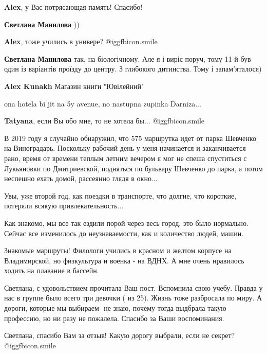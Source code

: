\begin{itemize}
\begin{itemize} %
\textbf{Alex}, у Вас потрясающая память! Спасибо!

\textbf{Светлана Манилова} ))

\textbf{Alex}, тоже учились в универе? @igg{fbicon.smile} 

\textbf{Светлана Манилова} так, на біологічному.
Але я і виріс поруч, тому 11-й був один із варіантів проїзду до центру. З глибокого дитинства. Тому і запам'яталося)

\textbf{Alex Kunakh} Магазин книги "Ювілейний"

ona hotela bi jit na 5y avenue, no nastupna zupinka Darniza...

\textbf{Tatyana}, если Вы обо мне, то не хотела бы... @igg{fbicon.smile} 
\end{itemize} %


В 2019 году я случайно обнаружил, что 575 маршрутка идет от парка Шевченко на
Виноградарь. Поскольку рабочий день у меня начинается и заканчивается рано,
время от времени теплым летним вечером я мог не спеша спуститься с Лукьяновки
по Дмитриевской, подняться по бульвару Шевченко до парка, а потом неспешно
ехать домой, рассеянно глядя в окно...

Увы, уже второй год, как поездки в транспорте, что долгие, что короткие,
потеряли всякую привлекательность...



Как знакомо, мы все так ездили порой через весь город, это было нормально.
Сейчас все изменилось до неузнаваемости, как и количество людей, машин.



Знакомые маршруты! Филологи учились в красном и желтом корпусе на Владимирской,
но физкультура и военка - на ВДНХ. А мне очень нравилось ходить на плавание в
бассейн.


Светлана, с удовольствием прочитала Ваш пост. Вспомнила свою учебу. Правда у
нас в группе было всего три девочки ( из 25). Жизнь тоже разбросала по миру. А
дороги, которые мы выбираем- не знаю, почему тогда выдбрала такую профессию, но
ни разу не пожалела. Спасибо за Ваши воспоминания.

\begin{itemize} %
Светлана, спасибо Вам за отзыв! Какую дорогу выбрали, если не секрет? @igg{fbicon.smile} 


\end{itemize}
\end{itemize}

